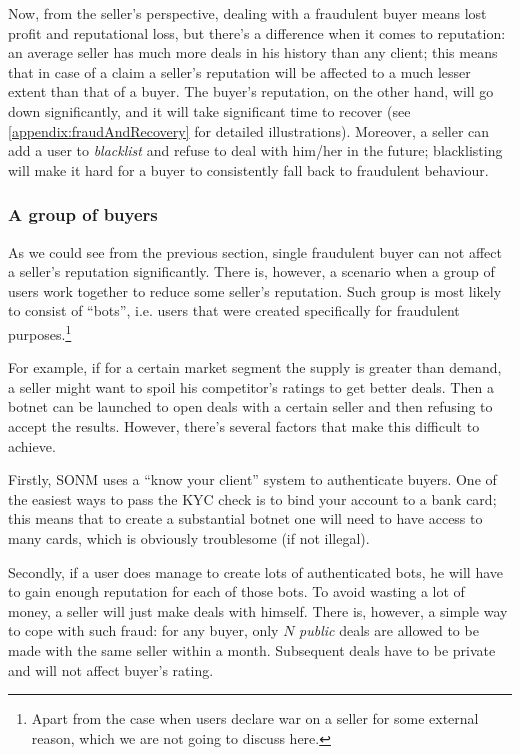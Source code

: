 \documentclass[11pt]{article}
\begin{document}
Now, from the seller's perspective, dealing with a fraudulent buyer means lost profit and reputational loss, but there's a difference when it comes to reputation: an average seller has much more deals in his history than any client; this means that in case of a claim a seller's reputation will be affected to a much lesser extent than that of a buyer. The buyer's reputation, on the other hand, will go down significantly, and it will take significant time to recover (see \ref{appendix:fraudAndRecovery} for detailed illustrations). Moreover, a seller can add a user to \textit{blacklist} and refuse to deal with him/her in the future; blacklisting will make it hard for a buyer to consistently fall back to fraudulent behaviour.

\subsubsection{A group of buyers} \label{threatModel:buyers:group}

As we could see from the previous section, single fraudulent buyer can not affect a seller's reputation significantly. There is, however, a scenario when a group of users work together to reduce some seller's reputation. Such group is most likely to consist of ``bots'', i.e. users that were created specifically for fraudulent purposes.\footnote{Apart from the case when users declare war on a seller for some external reason, which we are not going to discuss here.}

For example, if for a certain market segment the supply is greater than demand, a seller might want to spoil his competitor's ratings to get better deals. Then a botnet can be launched to open deals with a certain seller and then refusing to accept the results. However, there's several factors that make this difficult to achieve.

Firstly, SONM uses a ``know your client'' system to authenticate buyers. One of the easiest ways to pass the KYC check is to bind your account to a bank card; this means that to create a substantial botnet one will need to have access to many cards, which is obviously troublesome (if not illegal).

Secondly, if a user does manage to create lots of authenticated bots, he will have to gain enough reputation for each of those bots. To avoid wasting a lot of money, a seller will just make deals with himself. There is, however, a simple way to cope with such fraud: for any buyer, only $ N $ \textit{public} deals are allowed to be made with the same seller within a month. Subsequent deals have to be private and will not affect buyer's rating.
\end{document}
